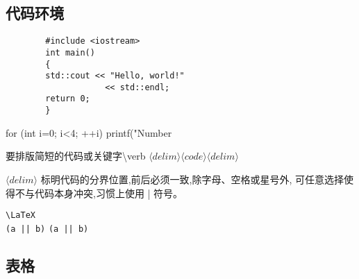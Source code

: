 \documentclass[a4paper]{ctexart}
\begin{document}
    \subsection{代码环境}
    \begin{verbatim}
        #include <iostream>
        int main() 
        {
        std::cout << "Hello, world!"
                    << std::endl;
        return 0;
        }
    \end{verbatim}
    \begin{verbatim*}
        for (int i=0; i<4; ++i)
        printf("Number %d\n",i);
    \end{verbatim*}
    要排版简短的代码或关键字\textbackslash verb $\langle delim\rangle\langle code\rangle\langle delim\rangle$\par
    $\langle delim\rangle$ 标明代码的分界位置,前后必须一致,除字母、空格或星号外,%
    可任意选择使得不与代码本身冲突,习惯上使用 | 符号。\par
    \verb|\LaTeX| \\ 
    \verb+(a || b)+ \verb*+(a || b)+    
    \subsection{表格}
\end{document}
